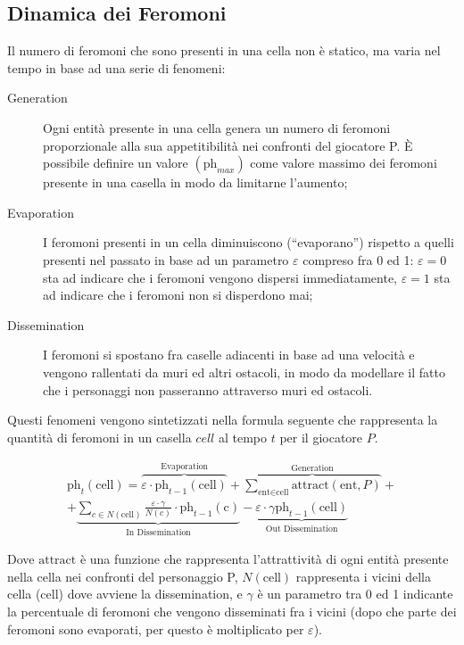 \documentclass[a4paper,11pt]{article}
\begin{document}
\subsection{Dinamica dei Feromoni}

Il numero di feromoni che sono presenti in una cella non \`e statico, ma varia nel tempo in base ad una serie di fenomeni:

\begin{description}
\item[Generation] Ogni entit\`a presente in una cella genera un numero di feromoni proporzionale alla sua appetitibilit\`a nei confronti del giocatore P. \`E possibile definire un valore $(\textrm{ph}_{max})$ come valore massimo dei feromoni presente in una casella in modo da limitarne l'aumento;
\item[Evaporation] I feromoni presenti in un cella diminuiscono (``evaporano'') rispetto a quelli presenti nel passato in base ad un parametro $\varepsilon$ compreso fra 0 ed 1: $\varepsilon = 0$ sta ad indicare che i feromoni vengono dispersi immediatamente, $\varepsilon = 1$ sta ad indicare che i feromoni non si disperdono mai;
\item[Dissemination] I feromoni si spostano fra caselle adiacenti in base ad una velocit\`a e vengono rallentati da muri ed altri ostacoli, in modo da modellare il fatto che i personaggi non passeranno attraverso muri ed ostacoli.
\end{description}

Questi fenomeni vengono sintetizzati nella formula seguente che rappresenta la quantit\`a di feromoni in un casella $cell$ al tempo $t$ per il giocatore $P$.

\begin{equation}
\begin{split}
\textrm{ph}_t (\textrm{cell}) = \overbrace{\varepsilon \cdot \textrm{ph}_{t-1} (\textrm{cell})}^{\text{Evaporation}} + \overbrace{\sum_{\textrm{ent} \in \textrm{cell}} \textrm{attract}(\textrm{ent}, P)}^{\text{Generation}} + \\ + \underbrace{\sum_{c \in N(\text{cell})} \frac{\varepsilon \cdot \gamma}{N(c)} \cdot \textrm{ph}_{t-1} (\textrm{c})}_{\text{In Dissemination}} - \underbrace{\varepsilon \cdot \gamma \textrm{ph}_{t-1} (\text{cell})}_{\text{Out Dissemination}}
\end{split}
\end{equation}

Dove $\text{attract}$ \`e una funzione che rappresenta l'attrattivit\`a di ogni entit\`a presente nella cella nei confronti del personaggio P, $N(\text{cell})$ rappresenta i vicini della cella ($\text{cell}$) dove avviene la dissemination, e $\gamma$ \`e un parametro tra 0 ed 1 indicante la percentuale di feromoni che vengono disseminati fra i vicini (dopo che parte dei feromoni sono evaporati, per questo \`e moltiplicato per $\varepsilon$).
\end{document}
